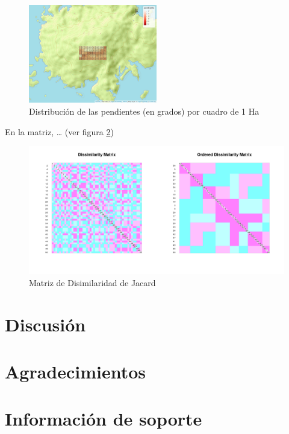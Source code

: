\documentclass[11pt,]{article}
\begin{document}
\begin{figure}
\centering
\includegraphics[width=0.50000\textwidth]{mapa_cuadros_pendiente.png}
\caption{Distribución de las pendientes (en grados) por cuadro de 1 Ha
\label{fig:mapa_cuadros_pendiente}}
\end{figure}

En la matriz, \ldots{} (ver figura
\ref{fig:matriz_disimilaridad_jacard})

\begin{figure}
\centering
\includegraphics{matriz_disimilaridad_jacard.png}
\caption{Matriz de Disimilaridad de Jacard
\label{fig:matriz_disimilaridad_jacard}}
\end{figure}

\section{Discusión}\label{discusiuxf3n}

\section{Agradecimientos}\label{agradecimientos}

\section{Información de soporte}\label{informaciuxf3n-de-soporte}
\end{document}
